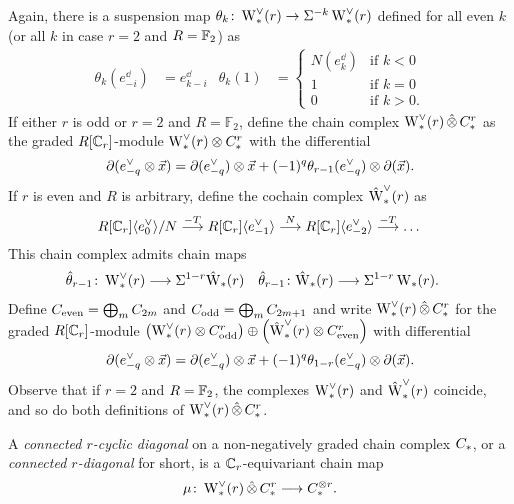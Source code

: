 Again, there is a suspension map $\theta_k \colon \rWd(r) \to \susp{-k}\rWd(r)$ defined for all even $k$ (or all $k$ in case $r=2$ and $R=\bF_2$) as
\begin{align*}
	\theta_k(e_{-i}^\dd) &= e_{k-i}^\dd
	&
	\theta_k(1) &= \begin{cases} N(e_k^\dd) &\text{if $k<0$} \\ 1 &\text{if $k=0$} \\ 0 &\text{if $k>0$.} \end{cases}
\end{align*}
If either $r$ is odd or $r=2$ and $R=\mathbb{F}_2$, define the chain complex $\rWd(r) \hotimes \rucadenas$ as the graded $R[\Cyc_r]$-module $\rWd(r) \ot \rucadenas$ with the differential
\[
\partial(e^\dd_{-q} \ot \vec{x}) = \partial (e^\dd_{-q}) \ot \vec{x} + (-1)^q \theta_{r-1}(e^\dd_{-q}) \ot \partial (\vec{x}).
\]
If $r$ is even and $R$ is arbitrary, define the cochain complex $\rWhatd(r)$ as
\[
R[\Cyc_r]\langle e_{0}^\dd\rangle / N \overset{-T}{\lra} R[\Cyc_r]\langle e_{-1}^\dd\rangle \overset{N}{\lra} R[\Cyc_r]\langle e_{-2}^\dd\rangle \overset{-T}{\lra}\dots
\]
This chain complex admits chain maps
\begin{align*}
	\hat{\theta}_{r-1} \colon \rWd(r)& \lra \susp{1-r}\rWhat(r)
	&
	\hat{\theta}_{r-1} \colon \rWhat(r)& \lra \susp{1-r}\rW(r).
\end{align*}
Define $\ucadenas[\mathrm{even}] = \bigoplus_{m}\ucadenas[2m]$ and $\ucadenas[\mathrm{odd}] = \bigoplus_{m}\ucadenas[2m+1]$ and write $\rWd(r) \hotimes \rucadenas$ for the graded $R[\Cyc_r]$-module $\left(\rWd(r) \ot \rucadenas[\mathrm{odd}]\right)\oplus \left(\rWhatd(r) \ot \rucadenas[\mathrm{even}]\right)$ with differential
\[
\partial(e^\vee_{-q} \ot \vec{x}) = \partial (e^\vee_{-q}) \ot \vec{x} + (-1)^q \theta_{1-r}(e^\vee_{-q}) \ot \partial (\vec{x}).
\]
Observe that if $r=2$ and $R=\bF_2$, the complexes $\rWd(r)$ and $\rWhatd(r)$ coincide, and so do both definitions of $\rWd(r) \hotimes \rucadenas$.

\begin{definition}
	A \emph{connected $r$-cyclic diagonal} on a non-negatively graded chain complex $\ucadenas$, or a \textit{connected $r$-diagonal} for short, is a $\Cyc_r$-equivariant chain map
	\[
	\mu \colon \rWd(r) \hotimes \rucadenas \lra \ucadenas^{\ot r}.
	\]
\end{definition}

